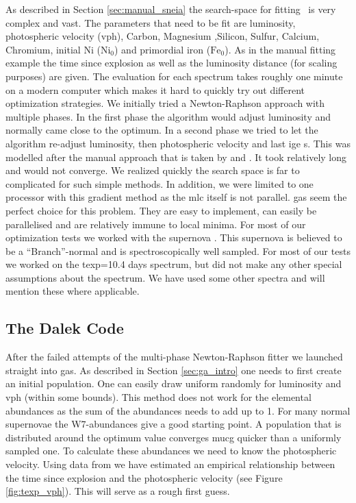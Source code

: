 As described in Section \ref{sec:manual_sneia} the search-space for fitting \sneia\ is very complex and vast. The parameters that need to be fit are luminosity, photospheric velocity (\gls{vph}), Carbon, Magnesium ,Silicon, Sulfur, Calcium, Chromium, initial Ni ($\textrm{Ni}_0$) and primordial iron ($\textrm{Fe}_0$). As in the manual fitting example the time since explosion as well as the luminosity distance (for scaling purposes) are given. The evaluation for each spectrum takes roughly one minute on a modern computer which makes it hard to quickly try out different optimization strategies. We initially tried a Newton-Raphson approach with multiple phases. In the first phase the algorithm would adjust luminosity and normally came close to the optimum. In a second phase we tried to let the algorithm re-adjust luminosity, then photospheric velocity and last \gls{ige} s. This was modelled after the manual approach that is taken by \citet{hachinger_dipl2007} and \citep{hachinger_phd2011}. It took relatively long and would not converge. We realized quickly the search space is far to complicated for such simple methods. In addition, we were limited to one processor with this gradient method as the \gls{mlc} itself is not parallel. \glspl{ga} seem the perfect choice for this problem. They are easy to implement, can easily be parallelised and are relatively immune to local minima. 
For most of our optimization tests we worked with the supernova  \citep{2004MNRAS.348..261B}. This supernova is believed to be a ``Branch''-normal and is spectroscopically well sampled. For most of our tests we worked on the \gls{texp}=10.4 days spectrum, but did not make any other special assumptions about the spectrum. We have used some other spectra and will mention these where applicable.

\subsection{The Dalek Code}

After the failed attempts of the multi-phase Newton-Raphson fitter we launched straight into \glspl{ga}. As described in Section \ref{sec:ga_intro} one needs to first create an initial population. One can easily draw uniform randomly for luminosity and \gls{vph} (within some bounds). This method does not work for the elemental abundances as the sum of the abundances needs to add up to 1. For many normal supernovae the W7-abundances  \citep{1984ApJ...286..644N} give a good starting point. A population that is distributed around the optimum value converges mucg quicker than a uniformly sampled one. To calculate these abundances we need to know the photospheric velocity. Using data from \citet{2005ApJ...623.1011B} we have estimated an empirical relationship between the time since explosion and the photospheric velocity (see Figure \ref{fig:texp_vph}). This will serve as a rough first guess.

